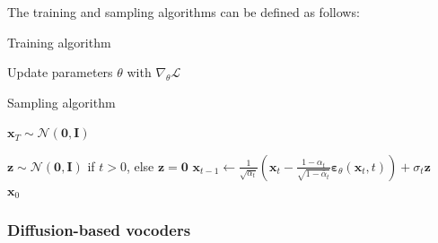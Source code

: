 \documentclass{article}
\begin{document}

The training and sampling algorithms can be defined as follows:

\begin{paracol}{2}

\begin{algorithm}[H]
\caption{Training algorithm}\label{alg:train}
\begin{algorithmic}

\Repeat
    \State Update parameters $\theta$ with $\nabla_{\theta}\mathcal{L}$ 


\end{algorithmic}
\end{algorithm}

\switchcolumn

\setcounter{algorithm}{1}
\begin{algorithm}[H]
\caption{Sampling algorithm}\label{alg:samp}
\begin{algorithmic}

\State $\bm{x}_T \sim \mathcal{N}(\bm{0}, \bm{I})$

\State $\bm{z} \sim \mathcal{N}(\bm{0}, \bm{I})$ if $t>0$, else $\bm{z} = \bm{0}$
\State $\bm{x}_{t-1} \gets \frac{1}{\sqrt{\alpha_t}}\left( \bm{x}_t- \frac{1-\alpha_t}{\sqrt{1-\bar{\alpha}_t}} \bm{\varepsilon}_{\theta}(\bm{x}_t, t)\right) + \sigma_t \bm{z}$
\EndFor \\
\Return $\bm{x}_0$

\end{algorithmic}
\end{algorithm}

\end{paracol}
\subsubsection{Diffusion-based vocoders}
\label{sec:diffvoc}
\end{document}

